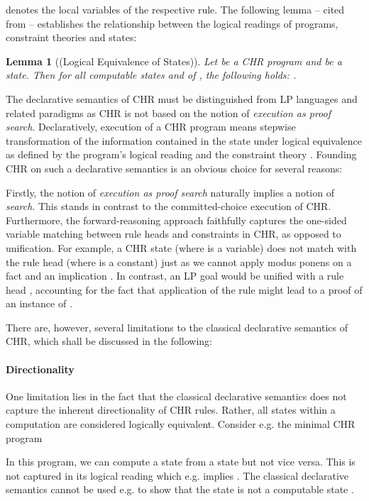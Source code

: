 \documentclass[acmtocl]{acmtrans2m}
\newtheorem{lemma}[theorem]{Lemma}
\begin{document}
 denotes the local variables of the respective rule. The following lemma
-- cited from  -- establishes the relationship between the
logical readings of programs, constraint theories and states:

\begin{lemma}[(Logical Equivalence of States)]
Let  be a CHR program and  be a state. Then for all computable states
 and  of , the following holds: .
\end{lemma}

The declarative semantics of CHR must be distinguished from LP languages and
related paradigms as CHR is not based on the notion of \emph{execution as proof
search}. Declaratively, execution of a CHR program means stepwise transformation
of the information contained in the state under logical equivalence as defined
by the program's logical reading  and the constraint theory .
Founding CHR on such a declarative semantics is an obvious choice for several
reasons:

Firstly, the notion of \emph{execution as proof search} naturally implies a
notion of \emph{search}. This stands in contrast to the committed-choice execution of CHR.
Furthermore, the forward-reasoning approach faithfully captures the one-sided
variable matching between rule heads and constraints in CHR, as opposed to
unification. For example, a CHR state  (where 
is a variable) does not match with the rule head  (where
 is a constant) just as we cannot apply modus ponens on a fact  and an implication . In contrast, an LP goal
 would be unified with a rule head , accounting
for the fact that application of the rule might lead to a proof of an instance
of .

There are, however, several limitations to the classical declarative semantics
of CHR, which shall be discussed in the following:

\paragraph*{Directionality} One limitation lies in the fact that the classical
declarative semantics does not capture the inherent directionality of CHR rules.
Rather, all states within a computation are considered logically equivalent.
Consider e.g. the minimal CHR program

In this program, we can compute a state  from a state
 but not vice versa. This is not captured in its
logical reading  which e.g. implies .
The classical declarative semantics cannot be used e.g. to show that the state
 is not a computable state
.
\end{document}

